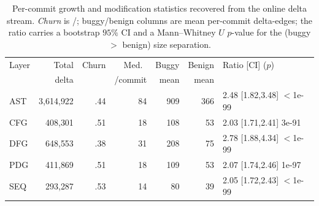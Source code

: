 \begin{table}[t]
	\centering
	\caption{Per-commit growth and modification statistics recovered from the online
		delta stream. \emph{Churn} is /; buggy/benign columns are
		mean per-commit delta-edges; the ratio carries a bootstrap $95\%$ CI and a
		Mann--Whitney $U$ $p$-value for the (buggy $>$ benign) size separation.}
	\label{tab:scal-growth}
	\begin{tabular}{lrrrrrl}
		\toprule
		Layer & Total & Churn & Med.\ & Buggy & Benign & Ratio [CI] \quad ($p$) \\
		& delta & & /commit & mean & mean & \\
		\midrule
		AST & 3{,}614{,}922 & .44 & 84 & 909 & 366 & 2.48 [1.82,3.48] $<$1e-99 \\
		CFG & 408{,}301 & .51 & 18 & 108 & 53 & 2.03 [1.71,2.41] 3e-91 \\
		DFG & 648{,}553 & .38 & 31 & 208 & 75 & 2.78 [1.88,4.34] $<$1e-99 \\
		PDG & 411{,}869 & .51 & 18 & 109 & 53 & 2.07 [1.74,2.46] 1e-97 \\
		SEQ & 293{,}287 & .53 & 14 & 80 & 39 & 2.05 [1.72,2.43] $<$1e-99 \\
		\bottomrule
	\end{tabular}
\end{table}